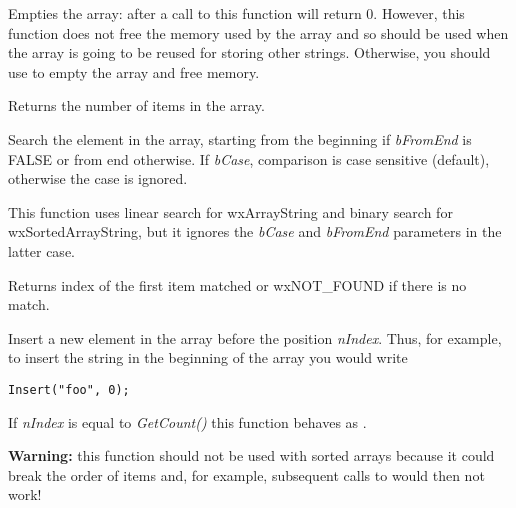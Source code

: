 \label{wxarraystringempty}


Empties the array: after a call to this function 
 will return $0$. However, this
function does not free the memory used by the array and so should be used when
the array is going to be reused for storing other strings. Otherwise, you
should use  to empty the array and free
memory.

\label{wxarraystringgetcount}


Returns the number of items in the array.

\label{wxarraystringindex}


Search the element in the array, starting from the beginning if
{\it bFromEnd} is FALSE or from end otherwise. If {\it bCase}, comparison is
case sensitive (default), otherwise the case is ignored.

This function uses linear search for wxArrayString and binary search for
wxSortedArrayString, but it ignores the {\it bCase} and {\it bFromEnd} 
parameters in the latter case.

Returns index of the first item matched or wxNOT\_FOUND if there is no match.

\label{wxarraystringinsert}


Insert a new element in the array before the position {\it nIndex}. Thus, for
example, to insert the string in the beginning of the array you would write

\begin{verbatim}
Insert("foo", 0);
\end{verbatim}

If {\it nIndex} is equal to {\it GetCount()} this function behaves as 
.

{\bf Warning:} this function should not be used with sorted arrays because it
could break the order of items and, for example, subsequent calls to 
 would then not work!

